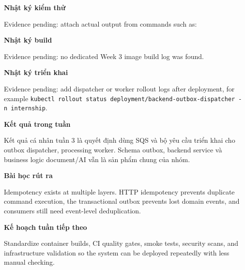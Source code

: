 \vspace{0.5em}\noindent\textbf{Nhật ký kiểm
thử}\par

Evidence pending: attach actual output from commands such as:

\begin{Shaded}
\begin{Highlighting}[]
 
 
\end{Highlighting}
\end{Shaded}

\vspace{0.5em}\noindent\textbf{Nhật ký build}\par

Evidence pending: no dedicated Week 3 image build log was found.

\vspace{0.5em}\noindent\textbf{Nhật ký triển
khai}\par

Evidence pending: add dispatcher or worker rollout logs after
deployment, for example
\texttt{kubectl\ rollout\ status\ deployment/\allowbreak{}backend-\allowbreak{}outbox-\allowbreak{}dispatcher\ -n\ internship}.

\vspace{0.5em}\noindent\textbf{Kết quả trong tuần}\par

Kết quả cá nhân tuần 3 là quyết định dùng SQS và bộ yêu cầu triển khai
cho outbox dispatcher, processing worker. Schema outbox, backend service
và business logic document/AI vẫn là sản phẩm chung của nhóm.

\vspace{0.5em}\noindent\textbf{Bài học rút ra}\par

Idempotency exists at multiple layers. HTTP idempotency prevents
duplicate command execution, the transactional outbox prevents lost
domain events, and consumers still need event-level deduplication.

\vspace{0.5em}\noindent\textbf{Kế hoạch tuần tiếp
theo}\par

Standardize container builds, CI quality gates, smoke tests, security
scans, and infrastructure validation so the system can be deployed
repeatedly with less manual checking.
